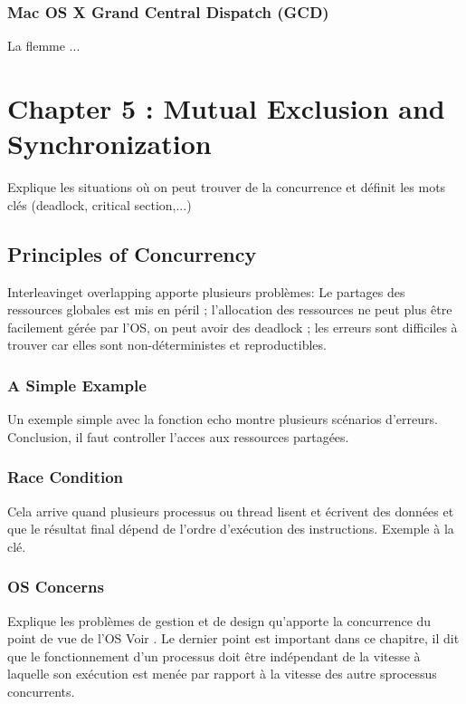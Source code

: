 \subsubsection{Mac OS X Grand Central Dispatch (GCD)}
La flemme ...

\newpage



\section{Chapter 5 : Mutual Exclusion and Synchronization}

Explique les situations où on peut trouver de la concurrence et définit les mots clés (deadlock, critical section,...)
\subsection{Principles of Concurrency}
Interleavinget overlapping apporte plusieurs problèmes: Le partages des ressources globales est mis en péril ; l'allocation des ressources ne peut plus être facilement gérée par l'OS, on peut avoir des deadlock ; les erreurs sont difficiles à trouver car elles sont non-déterministes et reproductibles.
\subsubsection{A Simple Example}
Un exemple simple avec la fonction echo montre plusieurs scénarios d'erreurs. Conclusion, il faut controller l'acces aux ressources partagées.
\subsubsection{Race Condition}
Cela arrive quand plusieurs processus ou thread lisent et écrivent des données et que le résultat final dépend de l'ordre d'exécution des instructions. Exemple à la clé.
\subsubsection{OS Concerns}
Explique les problèmes de gestion et de design qu'apporte la concurrence du point de vue de l'OS Voir \cite[p.~224]{stallings}. Le dernier point est important dans ce chapitre, il dit que le fonctionnement d'un processus doit être indépendant de la vitesse à laquelle son exécution est menée par rapport à la vitesse des autre sprocessus concurrents.
